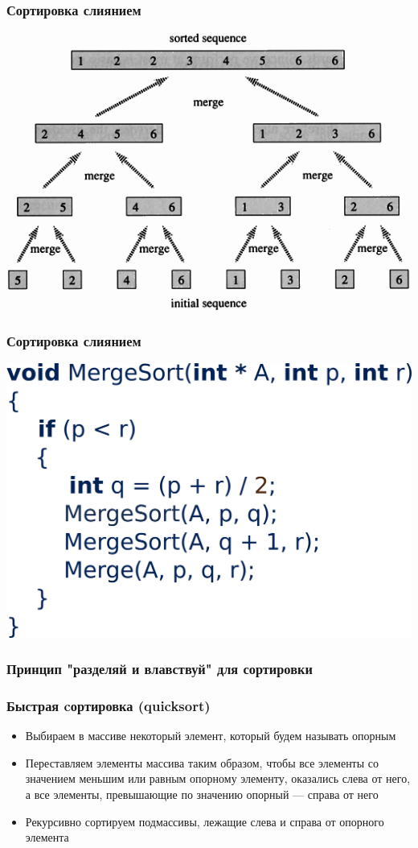 \documentclass[12pt,pdf,hyperref={unicode}]{beamer}
\begin{document}
\begin{frame}[fragile]
\frametitle{Сортировка слиянием} 
\begin{center}
\includegraphics[width=0.9\linewidth]{images/mergeSort.png}
\end{center}
\end{frame}


\begin{frame}[fragile]
\frametitle{Сортировка слиянием} 
\begin{center}
\includegraphics[width=0.9\linewidth]{images/mergeSort_pseudo.png}
\end{center}
\end{frame}



\begin{frame}[fragile]
\frametitle{Принцип "разделяй и влавствуй" для сортировки} 
\frametitle{Быстрая cортировка (quicksort)} 
\begin{itemize}
\item Выбираем в массиве некоторый элемент, который будем называть опорным \\
\item Переставляем элементы массива таким образом, чтобы все элементы со значением меньшим или равным опорному элементу, оказались слева от него, а все элементы, превышающие по значению опорный — справа от него \\
\item Рекурсивно сортируем подмассивы, лежащие слева и справа от опорного элемента\\
\end{itemize}
\end{frame}
\end{document}
